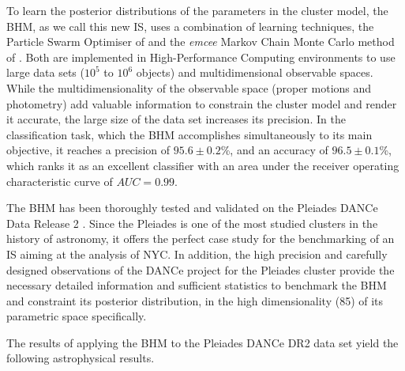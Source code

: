 To learn the posterior distributions of the parameters in the cluster model, the BHM, as we call this new IS, uses a combination of learning techniques, the Particle Swarm Optimiser of \citet{Kennedy1995,Clerc2002} and the \emph{emcee} Markov Chain Monte Carlo method of \citet{Foreman2013}. Both are implemented in High-Performance Computing environments to use large data sets ($10^5$ to $10^6$ objects) and multidimensional observable spaces. While the multidimensionality of the observable space (proper motions and photometry) add valuable information to constrain the cluster model and render it accurate, the large size of the data set increases its precision. In the classification task, which the BHM accomplishes simultaneously to its main objective, it reaches a precision of  $95.6\pm0.2$\%, and an accuracy of $96.5\pm0.1$\%, which ranks it as an excellent classifier with an area under the receiver operating characteristic curve of $AUC=0.99$.

The BHM has been thoroughly tested and validated on the Pleiades DANCe Data Release 2 \cite{Bouy2015}. Since the Pleiades is one of the most studied clusters in the history of astronomy, it offers the perfect case study for the benchmarking of an IS aiming at the analysis of NYC. In addition, the high precision and carefully designed observations of the DANCe project for the Pleiades cluster provide the necessary detailed information and sufficient statistics to benchmark the BHM and constraint its posterior distribution, in the high dimensionality (85) of its parametric space specifically. 

The results of applying the BHM to the Pleiades DANCe DR2 data set yield the following astrophysical results.

